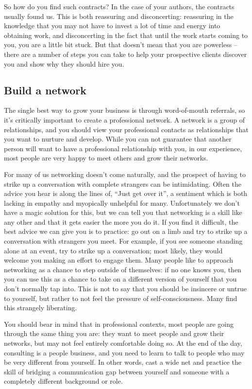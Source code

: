 \documentclass[
]{book}
\begin{document}
So how do you find such contracts? In the case of your authors, the contracts usually found us. This is both reassuring and disconcerting: reassuring in the knowledge that you may not have to invest a lot of time and energy into obtaining work, and disconcerting in the fact that until the work starts coming to you, you are a little bit stuck. But that doesn't mean that you are powerless -- there are a number of steps you can take to help your prospective clients discover you and show why they should hire you.

\hypertarget{build-a-network}{%
\subsection{Build a network}\label{build-a-network}}

The single best way to grow your business is through word-of-mouth referrals, so it's critically important to create a professional network. A network is a group of relationships, and you should view your professional contacts as relationships that you want to nurture and develop. While you can not guarantee that another person will want to have a professional relationship with you, in our experience, most people are very happy to meet others and grow their networks.

For many of us networking doesn't come naturally, and the prospect of having to strike up a conversation with complete strangers can be intimidating. Often the advice you hear is along the lines of, ``Just get over it'', a sentiment which is both lacking in empathy and myopically unhelpful for many. Unfortunately we don't have a magic solution for this, but we can tell you that networking is a skill like any other and that it gets easier the more you do it. If you find it difficult, the best advice we can give you is to practice: go out on a limb and try to strike up a conversation with strangers you meet. For example, if you see someone standing alone at an event, try to strike up a conversation; most likely, they would welcome you making an effort to engage them. Many people like to approach networking as a chance to step outside of themselves: if no one knows you, then you can use this as a chance to take on a different version of yourself that you don't normally tap into. This is not to say that you should be insincere or untrue to yourself, but rather to not feel the pressure of self-consciousness. Many find this strangely liberating.

You should bear in mind that in professional contexts, most people are going through the same thing you are: they want to meet people and grow their networks, but may not feel entirely comfortable doing so. At the end of the day, consulting is a people business, and you need to learn to talk to people who may be very different from yourself. In other words, cast a wide net and practice the skill of bridging a communication gap between yourself and someone with a completely different background or role.
\end{document}
